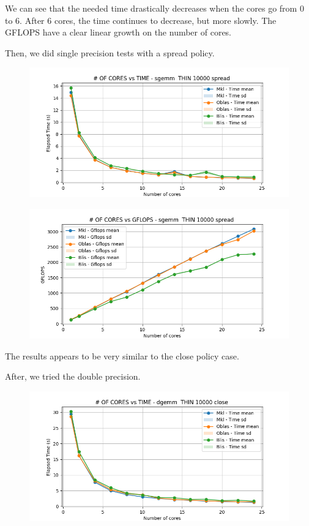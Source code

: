 \documentclass{article}
\begin{document}
We can see that the needed time drastically decreases when the cores go from 0 to 6. After 6 cores, the time continues to decrease, but more slowly. The GFLOPS have a clear linear growth on the number of cores.

Then, we did single precision tests with a spread policy.
\begin{figure}[H]
    \centering
    \includegraphics[width=\textwidth]{THIN scalability/sgemm__THIN_10000_spread_time.png}
\end{figure}

\begin{figure}[H]
    \centering
    \includegraphics[width=\textwidth]{THIN scalability/sgemm__THIN_10000_spread_gflops.png}
\end{figure}

The results appears to be very similar to the close policy case. 

After, we tried the double precision.
\begin{figure}[H]
    \centering
    \includegraphics[width=\textwidth]{THIN scalability/dgemm__THIN_10000_close_time.png}
\end{figure}
\end{document}
